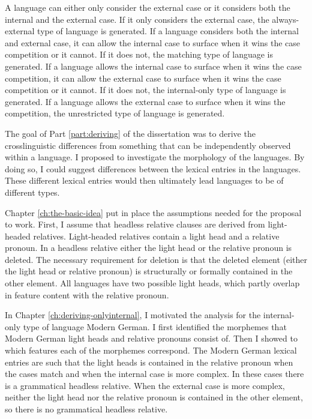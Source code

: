 A language can either only consider the external case or it considers both the internal and the external case. If it only considers the external case, the always-external type of language is generated.
If a language considers both the internal and external case, it can allow the internal case to surface when it wins the case competition or it cannot. If it does not, the matching type of language is generated.
If a language allows the internal case to surface when it wins the case competition, it can allow the external case to surface when it wins the case competition or it cannot. If it does not, the internal-only type of language is generated.
If a language allows the external case to surface when it wins the competition, the unrestricted type of language is generated.

The goal of Part \ref{part:deriving} of the dissertation was to derive the crosslinguistic differences from something that can be independently observed within a language. I proposed to investigate the morphology of the languages. By doing so, I could suggest differences between the lexical entries in the languages. These different lexical entries would then ultimately lead languages to be of different types.

Chapter \ref{ch:the-basic-idea} put in place the assumptions needed for the proposal to work. First, I assume that headless relative clauses are derived from light-headed relatives. Light-headed relatives contain a light head and a relative pronoun. In a headless relative either the light head or the relative pronoun is deleted. The necessary requirement for deletion is that the deleted element (either the light head or relative pronoun) is structurally or formally contained in the other element. All languages have two possible light heads, which partly overlap in feature content with the relative pronoun.

In Chapter \ref{ch:deriving-onlyinternal}, I motivated the analysis for the internal-only type of language Modern German. I first identified the morphemes that Modern German light heads and relative pronouns consist of. Then I showed to which features each of the morphemes correspond. The Modern German lexical entries are such that the light heads is contained in the relative pronoun when the cases match and when the internal case is more complex. In these cases there is a grammatical headless relative. When the external case is more complex, neither the light head nor the relative pronoun is contained in the other element, so there is no grammatical headless relative.

